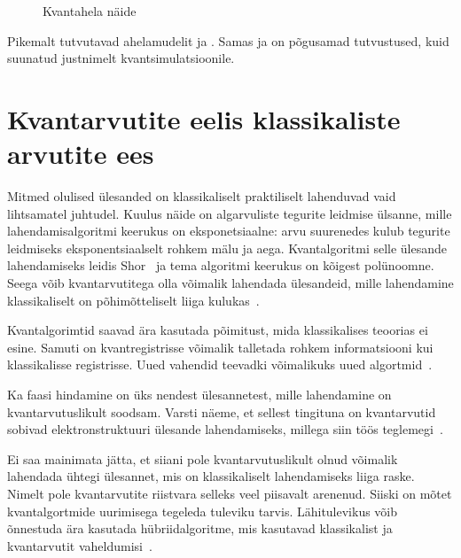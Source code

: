 \documentclass[12pt]{report}
\def\ket#1{\mathinner{|#1\rangle}}
\begin{document}
\begin{figure}
    \centering
    \caption{Kvantahela näide}
    \label{fig:circuits}
\end{figure}

Pikemalt tutvutavad ahelamudelit \cite{nielnsen+chuang} ja \cite{kaye+laflamme+mosca}.
Samas \cite{cao+etal} ja \cite{mcardle+etal} on põgusamad tutvustused, kuid suunatud justnimelt kvantsimulatsioonile.

\section{Kvantarvutite eelis klassikaliste arvutite ees}

Mitmed olulised ülesanded on klassikaliselt praktiliselt lahenduvad vaid lihtsamatel juhtudel.
Kuulus näide on algarvuliste tegurite leidmise ülsanne, mille lahendamisalgoritmi keerukus on eksponetsiaalne: arvu suurenedes kulub tegurite leidmiseks eksponentsiaalselt rohkem mälu ja aega.
Kvantalgoritmi selle ülesande lahendamiseks leidis Shor~\cite{shot} ja tema algoritmi keerukus on kõigest polünoomne.
Seega võib kvantarvutitega olla võimalik lahendada ülesandeid, mille lahendamine klassikaliselt on põhimõtteliselt liiga kulukas~\cite{nielse+chuang, kaye+laflamme+mosca, cao+etal}.

Kvantalgorimtid saavad ära kasutada põimitust, mida klassikalises teoorias ei esine.
Samuti on kvantregistrisse võimalik talletada rohkem informatsiooni kui klassikalisse registrisse.
Uued vahendid teevadki võimalikuks uued algortmid~\cite{cao+etal}.

Ka faasi hindamine on üks nendest ülesannetest, mille lahendamine on kvantarvutuslikult soodsam.
Varsti näeme, et sellest tingituna on kvantarvutid sobivad elektronstruktuuri ülesande lahendamiseks, millega siin töös teglemegi~\cite{cao+etal, mcardle+etal}.

Ei saa mainimata jätta, et siiani pole kvantarvutuslikult olnud võimalik lahendada ühtegi ülesannet, mis on klassikaliselt lahendamiseks liiga raske.
Nimelt pole kvantarvutite riistvara selleks veel piisavalt arenenud.
Siiski on mõtet kvantalgortmide uurimisega tegeleda tuleviku tarvis.
Lähitulevikus võib õnnestuda ära kasutada hübriidalgoritme, mis kasutavad klassikalist ja kvantarvutit vaheldumisi~\cite{omalley+etal}.
\end{document}
